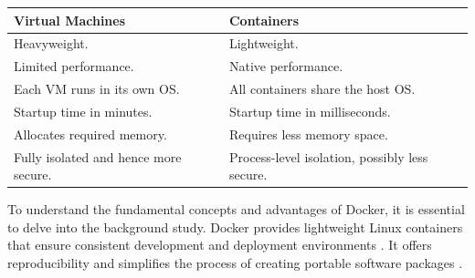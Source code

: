 \begin{table}[h]
    \begin{tabular}{|l|l|}
    \hline
    \textbf{Virtual Machines}             & \textbf{Containers}                            \\ \hline
    Heavyweight.                          & Lightweight.                                   \\
    Limited performance.                  & Native performance.                            \\
    Each VM runs in its own OS.           & All containers share the host OS.              \\
    Startup time in minutes.              & Startup time in milliseconds.                  \\
    Allocates required memory.            & Requires less memory space.                    \\
    Fully isolated and hence more secure. & Process-level isolation, possibly less secure. \\ \hline
    \end{tabular}
\end{table}

To understand the fundamental concepts and advantages of Docker, it is essential to delve into the background study. Docker provides lightweight Linux containers that ensure consistent development and deployment environments \cite{merkel2014docker}. It offers reproducibility and simplifies the process of creating portable software packages \cite{boettiger2015introduction}. 